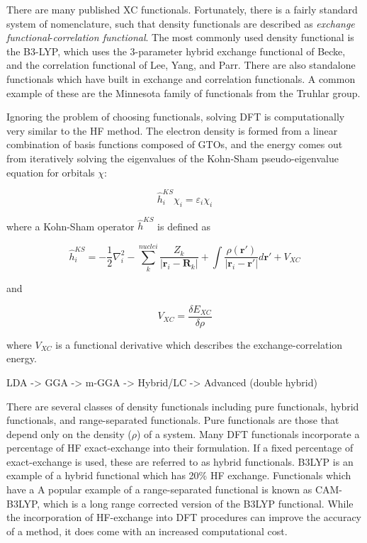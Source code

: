 There are many published XC functionals. Fortunately, there is a fairly standard system of nomenclature, such that density functionals are described as \emph{exchange functional}-\emph{correlation functional}. The most commonly used density functional is the  B3-LYP, which uses the 3-parameter hybrid exchange functional of Becke,\cite{Becke1993} and the correlation functional of Lee, Yang, and Parr.\cite{Lee1988} There are also standalone functionals which have built in exchange and correlation functionals. A common example of these are the Minnesota family of functionals from the Truhlar group.\cite{Zhao2006,Zhao2006a}

Ignoring the problem of choosing functionals, solving DFT is computationally very similar to the HF method. The electron density is formed from a linear combination of basis functions composed of GTOs, and the energy comes out from iteratively solving the eigenvalues of the Kohn-Sham pseudo-eigenvalue equation for orbitals $\chi$:

\begin{equation}
  \hat{h}_i^{KS} \chi_i = \varepsilon_i \chi_i
\end{equation}

\noindent where a Kohn-Sham operator $\hat{h}^{KS}$ is defined as

\begin{equation}
  \hat{h}_i^{KS} = -\frac{1}{2}\nabla^2_i - \sum_k^{nuclei}\frac{Z_k}{|\mathbf{r}_i-\mathbf{R}_k|} +
  \int \frac{\rho(\mathbf{r}\prime)}{|\mathbf{r}_i-\mathbf{r}\prime|} d\mathbf{r}\prime + V_{XC}
\end{equation}

\noindent and

\begin{equation}
  V_{XC} = \frac{\delta E_{XC}}{\delta\rho}
\end{equation}

\noindent where $V_{XC}$ is a functional derivative which describes the exchange-correlation energy.

LDA -> GGA -> m-GGA -> Hybrid/LC -> Advanced (double hybrid)



There are several classes of density functionals including pure functionals, hybrid functionals, and range-separated functionals. Pure functionals are those that depend only on the density ($\rho$) of a system. Many DFT functionals incorporate a percentage of HF exact-exchange into their formulation. If a fixed percentage of exact-exchange is used, these are referred to as hybrid functionals. B3LYP is an example of a hybrid functional which has 20\% HF exchange. Functionals which have a  A popular example of a range-separated functional is known as CAM-B3LYP,\cite{Yanai2004} which is a long range corrected version of the B3LYP functional. While the incorporation of HF-exchange into DFT procedures can improve the accuracy of a method, it does come with an increased computational cost.

